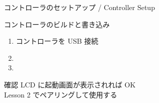 \documentclass[aspectratio=169, 14pt]{beamer}
\begin{document}
\begin{frame}{コントローラのセットアップ / Controller Setup}
  \begin{block}{コントローラのビルドと書き込み}
    \begin{enumerate}
      \item コントローラを USB 接続
      \item {}
      \item {}
    \end{enumerate}
  \end{block}

  \vspace{1em}

  \begin{exampleblock}{確認}
    LCD に起動画面が表示されれば OK\\
    Lesson 2 でペアリングして使用する
  \end{exampleblock}
\end{frame}
\end{document}
